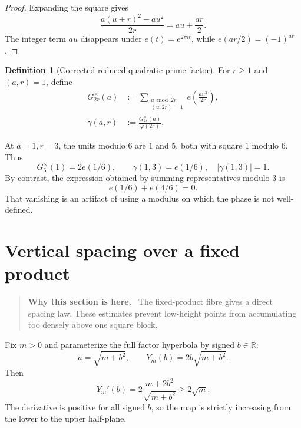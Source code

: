 \documentclass[11pt]{article}
\theoremstyle{definition}
\newtheorem{definition}[theorem]{Definition}
\theoremstyle{remark}
\newcommand{\1}{\mathbf{1}}
\newcommand{\R}{\mathbb{R}}
\newenvironment{motivation}
  {\begin{quote}\small\color{ovvogray}\textbf{Why this section is here.}\ }
  {\end{quote}}
\begin{document}
\begin{proof}
Expanding the square gives
\[
 \frac{a(u+r)^2-au^2}{2r}=au+\frac{ar}{2}.
\]
The integer term $au$ disappears under $e(t)=e^{2\pi i t}$, while
$e(ar/2)=(-1)^{ar}$.
\end{proof}

\begin{definition}[Corrected reduced quadratic prime factor]
\label{def:corrected-quadratic-factor}
For $r\ge1$ and $(a,r)=1$, define
\begin{align}
 G_{2r}^{\times}(a)
 &:={}
 \sum_{\substack{u\bmod 2r\\(u,2r)=1}}
 e\!\left(\frac{au^2}{2r}\right),
 \label{eq:corrected-reduced-Gauss}\\
 \gamma(a,r)
 &:={}
 \frac{G_{2r}^{\times}(a)}{\varphi(2r)}.
 \label{eq:normalized-corrected-factor}
\end{align}
\end{definition}

At $a=1,r=3$, the units modulo $6$ are $1$ and $5$, both with square $1$
modulo $6$.  Thus
\begin{equation}
 G_{6}^{\times}(1)=2e(1/6),
 \qquad
 \boxed{\gamma(1,3)=e(1/6),\quad |\gamma(1,3)|=1.}
 \label{eq:r3-corrected-factor}
\end{equation}
By contrast, the expression obtained by summing representatives modulo $3$ is
\[
 e(1/6)+e(4/6)=0.
\]
That vanishing is an artifact of using a modulus on which the phase is not
well-defined.

\section{Vertical spacing over a fixed product}
\label{sec:vertical-spacing}

\begin{motivation}
The fixed-product fibre gives a direct spacing law.  These estimates prevent low-height points from accumulating too densely above one square block.
\end{motivation}

Fix $m>0$ and parameterize the full factor hyperbola by signed $b\in\R$:
\begin{equation}
 a=\sqrt{m+b^2},
 \qquad
 Y_m(b)=2b\sqrt{m+b^2}.
 \label{eq:Y-b}
\end{equation}
Then
\begin{equation}
 Y_m'(b)
 =2\frac{m+2b^2}{\sqrt{m+b^2}}
 \ge2\sqrt m.
 \label{eq:Y-derivative}
\end{equation}
The derivative is positive for all signed $b$, so the map is strictly increasing from the lower to the upper half-plane.
\end{document}
